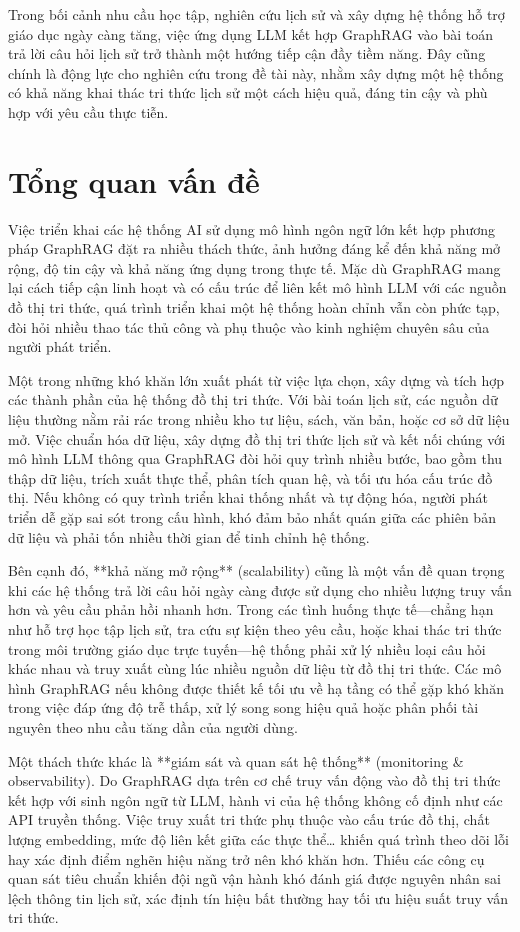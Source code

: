 Trong bối cảnh nhu cầu học tập, nghiên cứu lịch sử và xây dựng hệ thống hỗ trợ giáo dục ngày càng tăng, việc ứng dụng LLM kết hợp GraphRAG vào bài toán trả lời câu hỏi lịch sử trở thành một hướng tiếp cận đầy tiềm năng. Đây cũng chính là động lực cho nghiên cứu trong đề tài này, nhằm xây dựng một hệ thống có khả năng khai thác tri thức lịch sử một cách hiệu quả, đáng tin cậy và phù hợp với yêu cầu thực tiễn.

\section{Tổng quan vấn đề}
Việc triển khai các hệ thống AI sử dụng mô hình ngôn ngữ lớn kết hợp phương pháp GraphRAG đặt ra nhiều thách thức, ảnh hưởng đáng kể đến khả năng mở rộng, độ tin cậy và khả năng ứng dụng trong thực tế. Mặc dù GraphRAG mang lại cách tiếp cận linh hoạt và có cấu trúc để liên kết mô hình LLM với các nguồn đồ thị tri thức, quá trình triển khai một hệ thống hoàn chỉnh vẫn còn phức tạp, đòi hỏi nhiều thao tác thủ công và phụ thuộc vào kinh nghiệm chuyên sâu của người phát triển.

Một trong những khó khăn lớn xuất phát từ việc lựa chọn, xây dựng và tích hợp các thành phần của hệ thống đồ thị tri thức. Với bài toán lịch sử, các nguồn dữ liệu thường nằm rải rác trong nhiều kho tư liệu, sách, văn bản, hoặc cơ sở dữ liệu mở. Việc chuẩn hóa dữ liệu, xây dựng đồ thị tri thức lịch sử và kết nối chúng với mô hình LLM thông qua GraphRAG đòi hỏi quy trình nhiều bước, bao gồm thu thập dữ liệu, trích xuất thực thể, phân tích quan hệ, và tối ưu hóa cấu trúc đồ thị. Nếu không có quy trình triển khai thống nhất và tự động hóa, người phát triển dễ gặp sai sót trong cấu hình, khó đảm bảo nhất quán giữa các phiên bản dữ liệu và phải tốn nhiều thời gian để tinh chỉnh hệ thống.

Bên cạnh đó, **khả năng mở rộng** (scalability) cũng là một vấn đề quan trọng khi các hệ thống trả lời câu hỏi ngày càng được sử dụng cho nhiều lượng truy vấn hơn và yêu cầu phản hồi nhanh hơn. Trong các tình huống thực tế—chẳng hạn như hỗ trợ học tập lịch sử, tra cứu sự kiện theo yêu cầu, hoặc khai thác tri thức trong môi trường giáo dục trực tuyến—hệ thống phải xử lý nhiều loại câu hỏi khác nhau và truy xuất cùng lúc nhiều nguồn dữ liệu từ đồ thị tri thức. Các mô hình GraphRAG nếu không được thiết kế tối ưu về hạ tầng có thể gặp khó khăn trong việc đáp ứng độ trễ thấp, xử lý song song hiệu quả hoặc phân phối tài nguyên theo nhu cầu tăng dần của người dùng.

Một thách thức khác là **giám sát và quan sát hệ thống** (monitoring \& observability). Do GraphRAG dựa trên cơ chế truy vấn động vào đồ thị tri thức kết hợp với sinh ngôn ngữ từ LLM, hành vi của hệ thống không cố định như các API truyền thống. Việc truy xuất tri thức phụ thuộc vào cấu trúc đồ thị, chất lượng embedding, mức độ liên kết giữa các thực thể… khiến quá trình theo dõi lỗi hay xác định điểm nghẽn hiệu năng trở nên khó khăn hơn. Thiếu các công cụ quan sát tiêu chuẩn khiến đội ngũ vận hành khó đánh giá được nguyên nhân sai lệch thông tin lịch sử, xác định tín hiệu bất thường hay tối ưu hiệu suất truy vấn tri thức.

